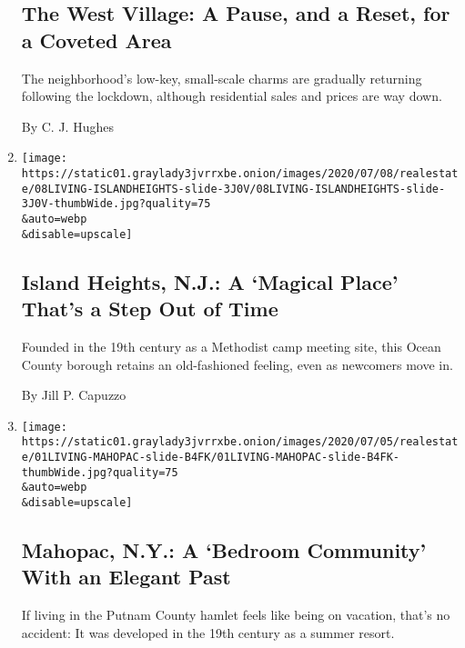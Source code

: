\begin{enumerate}
{  \subsection{The West Village: A Pause, and a Reset, for a Coveted
  Area}\label{the-west-village-a-pause-and-a-reset-for-a-coveted-area}}

  The neighborhood's low-key, small-scale charms are gradually returning
  following the lockdown, although residential sales and prices are way
  down.

  By C. J. Hughes
\item
  \href{/2020/07/08/realestate/island-heights-nj-a-magical-place-thats-a-step-out-of-time.html}{}

  \texttt{[image: https://static01.graylady3jvrrxbe.onion/images/2020/07/08/realestate/08LIVING-ISLANDHEIGHTS-slide-3J0V/08LIVING-ISLANDHEIGHTS-slide-3J0V-thumbWide.jpg?quality=75\\\&auto=webp\\\&disable=upscale]}

  \hypertarget{island-heights-nj-a-magical-place-thats-a-step-out-of-time}{%
  \subsection{Island Heights, N.J.: A `Magical Place' That's a Step Out
  of
  Time}\label{island-heights-nj-a-magical-place-thats-a-step-out-of-time}}

  Founded in the 19th century as a Methodist camp meeting site, this
  Ocean County borough retains an old-fashioned feeling, even as
  newcomers move in.

  By Jill P. Capuzzo
\item
  \href{/2020/07/01/realestate/mahopac-ny-a-bedroom-community-with-an-elegant-past.html}{}

  \texttt{[image: https://static01.graylady3jvrrxbe.onion/images/2020/07/05/realestate/01LIVING-MAHOPAC-slide-B4FK/01LIVING-MAHOPAC-slide-B4FK-thumbWide.jpg?quality=75\\\&auto=webp\\\&disable=upscale]}

  \hypertarget{mahopac-ny-a-bedroom-community-with-an-elegant-past}{%
  \subsection{Mahopac, N.Y.: A `Bedroom Community' With an Elegant
  Past}\label{mahopac-ny-a-bedroom-community-with-an-elegant-past}}

  If living in the Putnam County hamlet feels like being on vacation,
  that's no accident: It was developed in the 19th century as a summer
  resort.


\end{enumerate}
